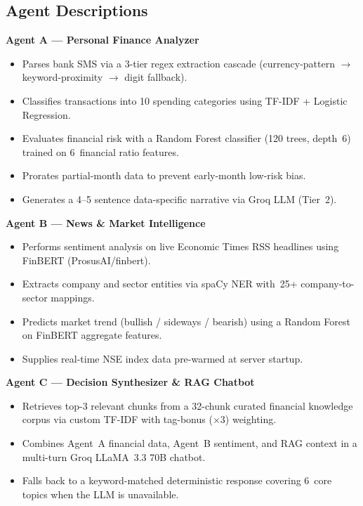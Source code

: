 \documentclass[12pt,a4paper]{article}
\begin{document}
\subsection{Agent Descriptions}

\textbf{Agent A --- Personal Finance Analyzer}
\begin{itemize}[leftmargin=1.5em]
  \item Parses bank SMS via a 3-tier regex extraction cascade (currency-pattern $\to$ keyword-proximity $\to$ digit fallback).
  \item Classifies transactions into 10 spending categories using TF-IDF + Logistic Regression.
  \item Evaluates financial risk with a Random Forest classifier (120 trees, depth~6) trained on 6~financial ratio features.
  \item Prorates partial-month data to prevent early-month low-risk bias.
  \item Generates a 4--5 sentence data-specific narrative via Groq LLM (Tier~2).
\end{itemize}

\textbf{Agent B --- News \& Market Intelligence}
\begin{itemize}[leftmargin=1.5em]
  \item Performs sentiment analysis on live Economic Times RSS headlines using FinBERT (ProsusAI/finbert).
  \item Extracts company and sector entities via spaCy NER with~25+ company-to-sector mappings.
  \item Predicts market trend (bullish / sideways / bearish) using a Random Forest on FinBERT aggregate features.
  \item Supplies real-time NSE index data pre-warmed at server startup.
\end{itemize}

\textbf{Agent C --- Decision Synthesizer \& RAG Chatbot}
\begin{itemize}[leftmargin=1.5em]
  \item Retrieves top-3 relevant chunks from a 32-chunk curated financial knowledge corpus via custom TF-IDF with tag-bonus ($\times 3$) weighting.
  \item Combines Agent~A financial data, Agent~B sentiment, and RAG context in a multi-turn Groq LLaMA~3.3 70B chatbot.
  \item Falls back to a keyword-matched deterministic response covering 6~core topics when the LLM is unavailable.
\end{itemize}
\end{document}
